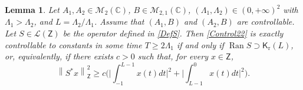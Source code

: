 \documentclass[10pt]{amsart}
\theoremstyle{plain}
\newtheorem{lemm}[theo]{Lemma}
\theoremstyle{definition}
\DeclareMathOperator{\range}{Ran}
\newcommand{\norm}[1]{\left\lVert #1\right\lVert}
\newcommand{\bgabs}[1]{\biggl\lvert #1\biggr \rvert}
\begin{document}
\begin{lemm}
\label{LemmIneqObservS}
Let $A_1, A_2 \in \mathcal M_2(\mathbb C)$, $B \in \mathcal M_{2, 1}(\mathbb C)$, $(\Lambda_1, \Lambda_2) \in (0, +\infty)^2$ with $\Lambda_1 > \Lambda_2$, and $L = \Lambda_2 / \Lambda_1$. Assume that $(A_1, B)$ and $(A_2, B)$ are controllable. Let $S \in \mathcal L(\mathsf Z)$ be the operator defined in \eqref{DefS}. Then \eqref{Control22} is exactly controllable to constants in some time $T \geq 2 \Lambda_1$ if and only if $\range S \supset \mathsf K_{\mathrm r}(L)$, or, equivalently, if there exists $c > 0$ such that, for every $x \in \mathsf Z$,
\begin{equation}
\label{IneqObservS}
\norm{S^\ast x}_{\mathsf Z}^2 \geq c \biggl(\bgabs{\int_{-1}^{L-1} x(t) dt}^2 + \bgabs{\int_{L-1}^{0} x(t) dt}^2\biggr).
\end{equation}
\end{lemm}
\end{document}

